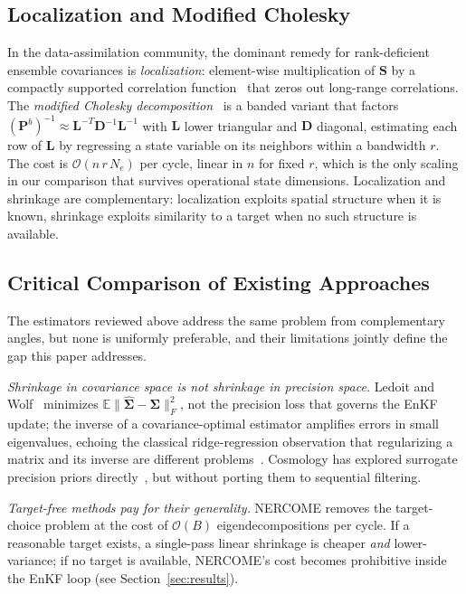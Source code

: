 \subsection{Localization and Modified Cholesky}
\label{sec:localization}

In the data-assimilation community, the dominant remedy for rank-deficient ensemble covariances is \emph{localization}: element-wise multiplication of $\mathbf{S}$ by a compactly supported correlation function~\cite{gaspari1999construction,houtekamer1998data} that zeros out long-range correlations. The \emph{modified Cholesky decomposition}~\cite{nino2018ensemble} is a banded variant that factors $(\mathbf{P}^b)^{-1} \approx \mathbf{L}^{-T}\mathbf{D}^{-1}\mathbf{L}^{-1}$ with $\mathbf{L}$ lower triangular and $\mathbf{D}$ diagonal, estimating each row of $\mathbf{L}$ by regressing a state variable on its neighbors within a bandwidth $r$. The cost is $\mathcal{O}(n\,r\,N_e)$ per cycle, linear in $n$ for fixed $r$, which is the only scaling in our comparison that survives operational state dimensions. Localization and shrinkage are complementary: localization exploits spatial structure when it is known, shrinkage exploits similarity to a target when no such structure is available.

\subsection{Critical Comparison of Existing Approaches}
\label{sec:critical}

The estimators reviewed above address the same problem from complementary angles, but none is uniformly preferable, and their limitations jointly define the gap this paper addresses.

\emph{Shrinkage in covariance space is not shrinkage in precision space.} Ledoit and Wolf~\cite{ledoit2004well} minimizes $\mathbb{E}\|\hat{\boldsymbol{\Sigma}} - \boldsymbol{\Sigma}\|_F^2$, not the precision loss that governs the EnKF update; the inverse of a covariance-optimal estimator amplifies errors in small eigenvalues, echoing the classical ridge-regression observation that regularizing a matrix and its inverse are different problems~\cite{hoerl1970ridge}. Cosmology has explored surrogate precision priors directly~\cite{paz2015improving,taylor2014estimating,sellentin2016parameter,dodelson2013effect}, but without porting them to sequential filtering.

\emph{Target-free methods pay for their generality.} NERCOME removes the target-choice problem at the cost of $\mathcal{O}(B)$ eigendecompositions per cycle. If a reasonable target exists, a single-pass linear shrinkage is cheaper \emph{and} lower-variance; if no target is available, NERCOME's cost becomes prohibitive inside the EnKF loop (see Section~\ref{sec:results}).

